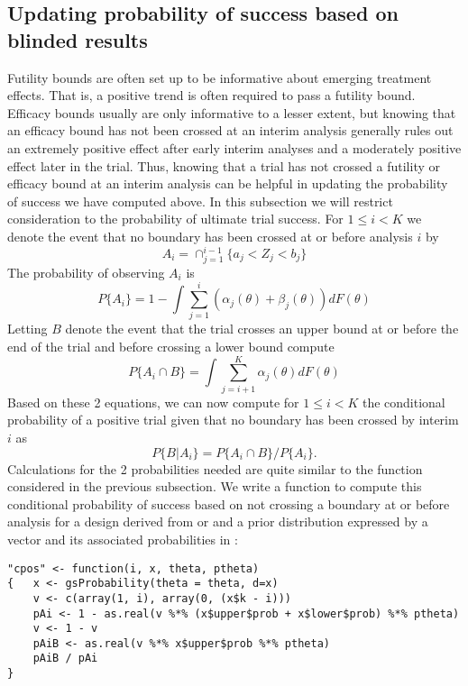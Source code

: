 \subsection{Updating probability of success based on blinded results}
Futility bounds are often set up to be informative about emerging treatment effects.
That is, a positive trend is often required to pass a futility bound.
Efficacy bounds usually are only informative to a lesser extent, but knowing that an efficacy bound has not been crossed at an interim analysis generally rules out an extremely positive effect after early interim analyses and a moderately positive effect later in the trial. 
Thus, knowing that a trial has not crossed a futility or efficacy bound at an interim analysis can be helpful in updating the probability of success we have computed above.
In this subsection we will restrict consideration to the probability of ultimate trial success.
For $1\leq i< K$ we denote the event that no boundary has been crossed at or before analysis $i$ by
\begin{equation}
A_i=\cap_{j=1}^{i-1}\{a_{j}<Z_{j}<b_{j}\}
\end{equation} 
The probability of observing $A_i$ is
\begin{equation}
P\{A_i\}= 1 - \int \sum_{j=1}^i(\alpha_j(\theta)+\beta_j(\theta))dF(\theta)
\end{equation}
Letting $B$ denote the event that the trial crosses an upper bound at or before the end of the trial and before crossing a lower bound compute
\begin{equation}
P\{A_i\cap B\}=\int \sum_{j=i+1}^K\alpha_j(\theta)dF(\theta)
\end{equation}
Based on these 2 equations, we can now compute for $1\leq i< K$ the conditional probability of a positive trial given that no boundary has been crossed by interim $i$ as
\begin{equation}
P\{B | A_i\} = P\{A_i\cap B\} / P\{A_i\}.
\end{equation}
Calculations for the 2 probabilities needed are quite similar to the  function considered in the previous subsection.
We write a function to compute this conditional probability of success based on not crossing a boundary at or before analysis  for a design  derived from  or  and a prior distribution expressed by a vector  and its associated probabilities in :
\begin{verbatim}
"cpos" <- function(i, x, theta, ptheta) 
{   x <- gsProbability(theta = theta, d=x)
    v <- c(array(1, i), array(0, (x$k - i)))
    pAi <- 1 - as.real(v %*% (x$upper$prob + x$lower$prob) %*% ptheta)
    v <- 1 - v
    pAiB <- as.real(v %*% x$upper$prob %*% ptheta)
    pAiB / pAi
}
\end{verbatim}

